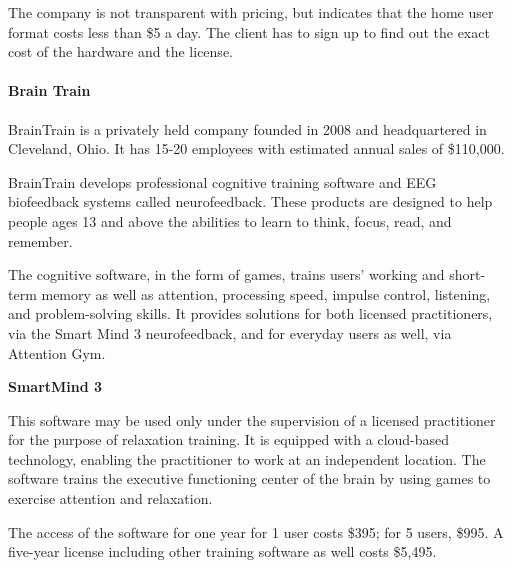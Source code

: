 \documentclass[letterpaper,10pt]{article}
\begin{document}
The company is not transparent with pricing, but indicates that the home user format costs less than \$5 a day. The client has to sign up to find out the exact cost of the hardware and the license.

\cite{play_attention}

\paragraph{Brain Train}

BrainTrain is a privately held company founded in 2008 and headquartered  in Cleveland, Ohio. It has 15-20 employees with estimated annual sales of \$110,000. 

\cite{mergent_intellect}

BrainTrain develops professional cognitive training software and EEG biofeedback systems called neurofeedback. These products are designed to help people ages 13 and above the abilities to learn to think, focus, read, and remember.

The cognitive software, in the form of games, trains users’ working and short-term memory as well as attention, processing speed, impulse control, listening, and problem-solving skills.
It provides solutions for both licensed practitioners, via the Smart Mind 3 neurofeedback, and for everyday users as well, via Attention Gym.

\textbf{SmartMind 3} 

This software may be used only under the supervision of a licensed practitioner for the purpose of relaxation training. It is equipped with a cloud-based technology, enabling the practitioner to work at an independent location. The software  trains the executive functioning center of the brain by using games to exercise attention and relaxation.

The access of the software for one year for 1 user costs \$395; for 5 users, \$995. A five-year license including other training software as well costs \$5,495. 
\end{document}
